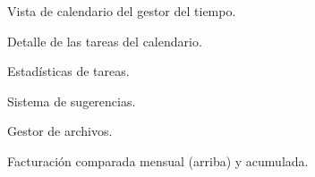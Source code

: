 \begin{figure}
\centering
{}
\caption{Vista de calendario del gestor del tiempo.}
\label{fig:tareas_cal2}
\end{figure}

\begin{figure}
\centering
{}
\caption{Detalle de las tareas del calendario.}
\label{fig:tareas2}
\end{figure}

\begin{figure}
\centering
{}
\caption{Estadísticas de tareas.}
\label{fig:tareas_stats}
\end{figure}

\begin{figure}
\centering
{}
\caption{Sistema de sugerencias.}
\label{fig:sugerencias}
\end{figure}

\begin{figure}
\centering
{}
\caption{Gestor de archivos.}
\label{fig:archivos}
\end{figure}


\begin{figure}
\centering
{}
\caption{Facturación comparada mensual (arriba) y acumulada.}
\label{fig:facturacion}
\end{figure}
